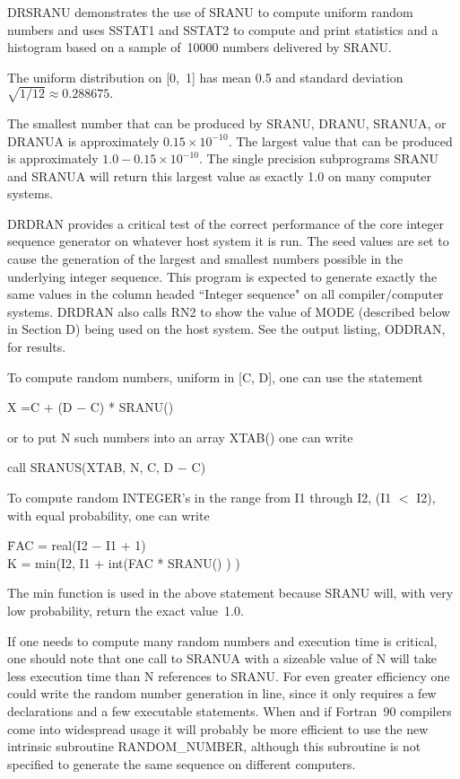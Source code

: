 \documentclass[twoside]{MATH77}
\begin{document}
DRSRANU demonstrates the use of SRANU to compute uniform random numbers and
uses SSTAT1 and SSTAT2 to compute and print statistics and a histogram based
on a sample of~10000 numbers delivered by SRANU.

The uniform distribution on [0,~1] has mean 0.5 and standard deviation $%
\sqrt{1/12} \approx 0.288675.$

The smallest number that can be produced by SRANU, DRANU, SRANUA, or DRANUA
is approximately $0.15 \times 10^{-10}$. The largest value that can be
produced is approximately $1.0 - 0.15 \times 10^{-10}$. The single precision
subprograms SRANU and SRANUA will return this largest value as exactly 1.0
on many computer systems.

DRDRAN provides a critical test of the correct performance of the
core integer sequence generator on whatever host system it is run.
The seed values are set to cause the generation of the largest and
smallest numbers possible in the underlying integer sequence. This
program is expected to generate exactly the same values in the column
headed ``Integer sequence" on all compiler/computer systems. DRDRAN
also calls RN2 to show the value of MODE (described below in Section
D) being used on the host system. See the output listing, ODDRAN, for
results.

To compute random numbers, uniform in [C, D], one can use the statement

\hspace{.2in}X =C + (D $-$ C) * SRANU()

or to put N such numbers into an array XTAB() one can write

\hspace{.2in}call SRANUS(XTAB, N, C, D $-$ C)

To compute random INTEGER's in the range from I1 through I2, (I1 $<$ I2),
with equal probability, one can write
\begin{tabbing}
\hspace{.2in}\=FAC = real(I2 $-$ I1 + 1)\\
\>K = min(I2, I1 + int(FAC * SRANU() ) )
\end{tabbing}
The min function is used in the above statement because SRANU will, with
very low probability, return the exact value~1.0.

If one needs to compute many random numbers and execution time is critical,
one should note that one call to SRANUA with a sizeable value of N will take
less execution time than N references to SRANU. For even greater efficiency
one could write the random number generation in line, since it only requires
a few declarations and a few executable statements. When and if Fortran~90
compilers come into widespread usage it will probably be more efficient to
use the new intrinsic subroutine RANDOM\_NUMBER, although this subroutine is
not specified to generate the same sequence on different computers.
\end{document}
